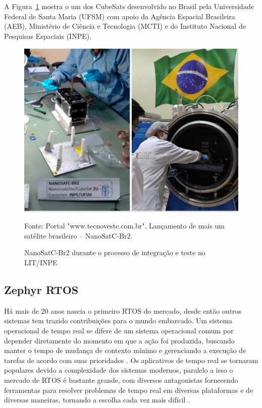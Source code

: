 A Figura~\ref{fig: CubeSat NanoSatC-Br2} mostra o um dos CubeSats desenvolvido no Brasil pela Universidade 
Federal de Santa Maria (UFSM) com apoio da Agência Espacial Brasileira (AEB), Ministério de Ciência e 
Tecnologia (MCTI) e do Instituto Nacional de Pesquisas Espaciais (INPE).

\begin{figure}[H]
	\centering
	\includegraphics[width=15cm]{imagens/cubesat_brasil.jpg}
	\caption{NanoSatC-Br2 durante o processo de integração e teste no LIT/INPE}
	Fonte: Portal "www.tecnoveste.com.br", Lançamento de mais um satélite brasileiro – NanoSatC-Br2.
	\label{fig: CubeSat NanoSatC-Br2}
\end{figure}

\subsection{Zephyr RTOS}
Há mais de 20 anos nascia o primeiro RTOS do mercado, desde então outros sistemas tem trazido 
contribuições para o mundo embarcado. Um sistema operacional de tempo real se difere de um sistema 
operacional comum por depender diretamente do momento em que a ação foi produzida, buscando 
manter o tempo de mudança de contexto mínimo e gerenciando a execução de tarefas de acordo com 
suas prioridades \cite{Hambarde}. Os aplicativos de tempo real se tornaram populares devido a 
complexidade dos sistemas modernos, paralelo a isso o mercado de RTOS é bastante grande, com 
diversos antagonistas fornecendo ferramentas para resolver problemas de tempo real em diversas 
plataformas e de diversas maneiras, tornando a escolha cada vez mais difícil \cite{Hambarde}.


